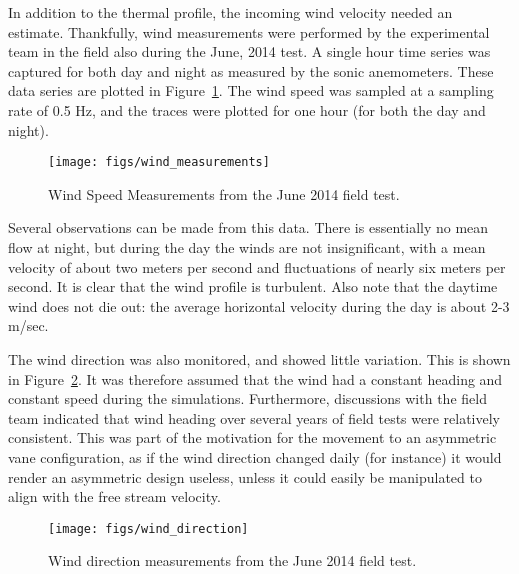 In addition to the thermal profile, the incoming wind velocity needed an 
estimate. Thankfully, wind measurements were performed by the
experimental team in the field also during the June, 2014 test. A single 
hour time series was captured for both day and night as measured by the
sonic anemometers. These data series are plotted in
Figure~\ref{fig:wind_speed_estimate}. The wind speed was sampled at a
sampling rate of 0.5 Hz, and the traces were plotted for one hour (for
both the day and night). 

 \begin{figure}[!htb]
  \begin{center}
   \texttt{[image: figs/wind\_measurements]}
   \caption{Wind Speed Measurements from the June 2014 field test.}
   \label{fig:wind_speed_estimate}
  \end{center}
 \end{figure}

Several observations can be made from this data. There is essentially no
mean flow at night, but during the day the winds are not insignificant,
with a mean velocity of about two meters per second and fluctuations of
nearly six meters per second. It is clear that the wind profile is
turbulent.  Also note that the daytime wind does not die out: the
average horizontal velocity during the day is about 2-3 m/sec. 

The wind direction was also monitored, and showed little variation. 
This is shown in Figure~\ref{fig:wind_direction}. It was therefore
assumed that the wind had a constant heading and constant speed during
the simulations. Furthermore, discussions with the field team indicated
that wind heading over several years of field tests were relatively
consistent. This was part of the motivation for the movement to an
asymmetric vane configuration, as if the wind direction changed daily
(for instance) it would render an asymmetric design useless, unless it
could easily be manipulated to align with the free stream velocity. 

 \begin{figure}[!htb]
  \begin{center}
   \texttt{[image: figs/wind\_direction]}
   \caption{Wind direction measurements from the June 2014 field test.}
   \label{fig:wind_direction}
  \end{center}
 \end{figure}



